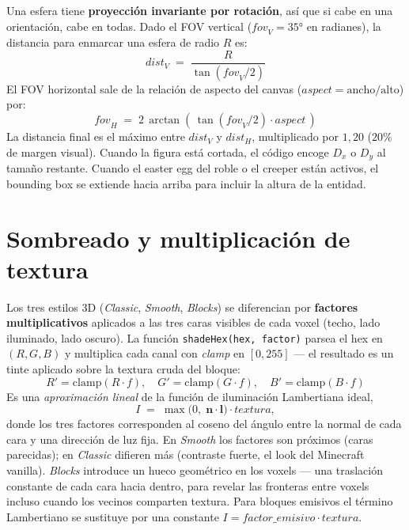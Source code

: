 \documentclass[12pt,a4paper]{scrartcl}
\newcommand{\code}[1]{\texttt{\small #1}}
\newcommand{\acc}[1]{\textcolor{accent}{\textbf{#1}}}
\begin{document}
Una esfera tiene \acc{proyección invariante por rotación}, así que si cabe en una orientación, cabe en todas. Dado el FOV vertical ($\mathit{fov}_V = 35°$ en radianes), la distancia para enmarcar una esfera de radio $R$ es:
\[
\mathit{dist}_V \;=\; \dfrac{R}{\tan(\mathit{fov}_V / 2)}
\]
El FOV horizontal sale de la relación de aspecto del canvas ($\mathit{aspect} = \text{ancho}/\text{alto}$) por:
\[
\mathit{fov}_H \;=\; 2\,\arctan\!\left(\,\tan(\mathit{fov}_V/2)\cdot \mathit{aspect}\,\right)
\]
La distancia final es el máximo entre $\mathit{dist}_V$ y $\mathit{dist}_H$, multiplicado por $1{,}20$ ($20\%$ de margen visual). Cuando la figura está cortada, el código encoge $D_x$ o $D_y$ al tamaño restante. Cuando el easter egg del roble o el creeper están activos, el bounding box se extiende hacia arriba para incluir la altura de la entidad.

\section{Sombreado y multiplicación de textura}

Los tres estilos 3D (\emph{Classic}, \emph{Smooth}, \emph{Blocks}) se diferencian por \acc{factores multiplicativos} aplicados a las tres caras visibles de cada voxel (techo, lado iluminado, lado oscuro). La función \code{shadeHex(hex, factor)} parsea el hex en $(R,G,B)$ y multiplica cada canal con \emph{clamp} en $[0, 255]$ --- el resultado es un tinte aplicado sobre la textura cruda del bloque:
\[
R' = \mathrm{clamp}(R \cdot f),\quad
G' = \mathrm{clamp}(G \cdot f),\quad
B' = \mathrm{clamp}(B \cdot f)
\]
Es una \emph{aproximación lineal} de la función de iluminación Lambertiana ideal,
\[
I \;=\; \max\bigl(0,\;\mathbf{n}\cdot\mathbf{l}\bigr)\cdot \mathit{textura},
\]
donde los tres factores corresponden al coseno del ángulo entre la normal de cada cara y una dirección de luz fija. En \emph{Smooth} los factores son próximos (caras parecidas); en \emph{Classic} difieren más (contraste fuerte, el look del Minecraft vanilla). \emph{Blocks} introduce un hueco geométrico en los voxels --- una traslación constante de cada cara hacia dentro, para revelar las fronteras entre voxels incluso cuando los vecinos comparten textura. Para bloques emisivos el término Lambertiano se sustituye por una constante $I = \mathit{factor\_emisivo} \cdot \mathit{textura}$.
\end{document}

